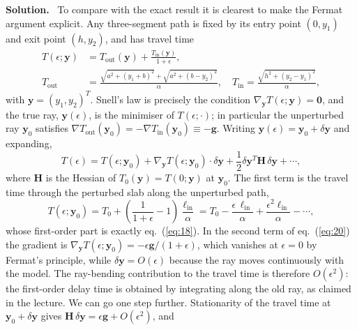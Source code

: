 \documentclass[a4paper,12pt]{paper}
\newenvironment{solution}{\par\noindent\textbf{Solution.}\ }{\par\medskip}
\begin{document}
\begin{solution}
To compare with the exact result it is clearest to make the Fermat argument explicit. Any
three-segment path is fixed by its entry point $(0,y_{1})$ and exit point $(h,y_{2})$, and has travel
time
\begin{align}
    T(\epsilon;\mathbf{y}) &= T_{\mathrm{out}}(\mathbf{y}) + \frac{T_{\mathrm{in}}(\mathbf{y})}{1+\epsilon}, \nonumber \\
    T_{\mathrm{out}} &= \frac{\sqrt{a^{2}+(y_{1}+b)^{2}}+\sqrt{a^{2}+(b-y_{2})^{2}}}{\alpha},\quad
    T_{\mathrm{in}} = \frac{\sqrt{h^{2}+(y_{2}-y_{1})^{2}}}{\alpha},
    \label{eq:19}
\end{align}
with $\mathbf{y}=(y_{1},y_{2})^{T}$. Snell's law is precisely the condition
$\nabla_{\mathbf{y}}T(\epsilon;\mathbf{y})=\mathbf{0}$, and the true ray, $\mathbf{y}(\epsilon)$, is the
minimiser of $T(\epsilon;\cdot)$; in particular the unperturbed ray $\mathbf{y}_{0}$ satisfies
$\nabla T_{\mathrm{out}}(\mathbf{y}_{0}) = -\nabla T_{\mathrm{in}}(\mathbf{y}_{0}) \equiv -\mathbf{g}$.
Writing $\mathbf{y}(\epsilon) = \mathbf{y}_{0}+\delta\mathbf{y}$ and expanding,
\begin{equation}
    T(\epsilon) = T(\epsilon;\mathbf{y}_{0}) + \nabla_{\mathbf{y}}T(\epsilon;\mathbf{y}_{0})\cdot\delta\mathbf{y}
    + \frac{1}{2}\delta\mathbf{y}^{T}\mathbf{H}\,\delta\mathbf{y} + \cdots,
    \label{eq:20}
\end{equation}
where $\mathbf{H}$ is the Hessian of $T_{0}(\mathbf{y}) = T(0;\mathbf{y})$ at $\mathbf{y}_{0}$. The first
term is the travel time through the perturbed slab along the unperturbed path,
\begin{equation}
    T(\epsilon;\mathbf{y}_{0}) = T_{0} + \left(\frac{1}{1+\epsilon}-1\right)\frac{\ell_{\mathrm{in}}}{\alpha}
    = T_{0} - \frac{\epsilon\,\ell_{\mathrm{in}}}{\alpha} + \frac{\epsilon^{2}\ell_{\mathrm{in}}}{\alpha} - \cdots,
    \label{eq:21}
\end{equation}
whose first-order part is exactly eq.~(\ref{eq:18}). In the second term of eq.~(\ref{eq:20}) the
gradient is $\nabla_{\mathbf{y}}T(\epsilon;\mathbf{y}_{0}) = -\epsilon\mathbf{g}/(1+\epsilon)$, which
vanishes at $\epsilon=0$ by Fermat's principle, while $\delta\mathbf{y}=O(\epsilon)$ because
the ray moves continuously with the model. The ray-bending contribution to the travel time is
therefore $O(\epsilon^{2})$: the first-order delay time is obtained by integrating along the old
ray, as claimed in the lecture. We can go one step further. Stationarity of the travel time at
$\mathbf{y}_{0}+\delta\mathbf{y}$ gives $\mathbf{H}\,\delta\mathbf{y} = \epsilon\mathbf{g}+O(\epsilon^{2})$, and

\end{solution}
\end{document}
